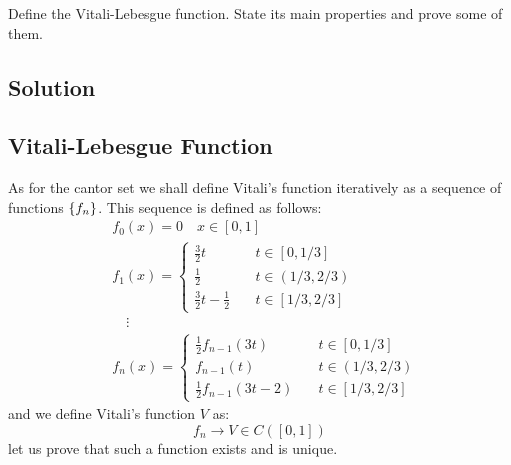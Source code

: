 
\question

Define the Vitali-Lebesgue function. State its main properties and prove some of 
them.

\subsection*{Solution}

\subsection{Vitali-Lebesgue Function}
As for the cantor set we shall define Vitali's function iteratively as a sequence of functions $\{ f_n \}$. This sequence is defined as follows:
\begin{align*}
    & f_0(x) = 0 \quad x\in [0,1] \\
    & f_1(x) = \begin{cases}
        \frac{3}{2}t \quad & t\in [0,1/3] \\
        \frac{1}{2} \quad & t\in (1/3,2/3) \\
        \frac{3}{2}t - \frac{1}{2} \quad & t\in [1/3,2/3]
    \end{cases} \\
    & \quad \vdots \\
    & f_{n}(x) = \begin{cases}
        \frac{1}{2}f_{n-1}(3t) \quad & t\in [0,1/3] \\
        f_{n-1}(t) \quad & t\in (1/3,2/3) \\
        \frac{1}{2}f_{n-1}(3t - 2) \quad & t\in [1/3,2/3]
    \end{cases}
\end{align*}
and we define Vitali's function $V$ as:
\[
    f_n \to V \in C([0,1])    
\]
let us prove that such a function exists and is unique.

